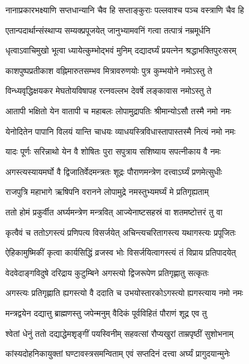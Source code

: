 \twolineshloka
{नानाप्रकारभक्ष्याणि सप्तधान्यानि चैव हि}
{सप्ताङ्कुराः पल्लवाश्च पञ्च वस्त्राणि चैव हि} %

\twolineshloka
{एतान्पदार्थान्संस्थाप्य सम्यक्प्रपूजयेत्}
{जानुभ्यामवनिं गत्वा तत्पात्रं नम्रमूर्धनि} %

\twolineshloka
{धृत्वाऽवाचिमुखो भूत्वा ध्यायेत्कुम्भोद्भवं मुनिम्}
{दद्यादर्घ्यं प्रयत्नेन श्रद्धाभक्तिपुरःसरम्} %

\twolineshloka
{काशपुष्पप्रतीकाश वह्निमारुतसम्भव}
{मित्रावरुणयोः पुत्र कुम्भयोने नमोऽस्तु ते} %

\twolineshloka
{विन्ध्यवृद्धिक्षयकर मेघतोयविषापह}
{रत्नवल्लभ देवर्षे लङ्कावास नमोऽस्तु ते} %

\twolineshloka
{आतापी भक्षितो येन वातापी च महाबलः}
{लोपामुद्रापतिः श्रीमान्योऽसौ तस्मै नमो नमः} %

\twolineshloka
{येनोदितेन पापानि विलयं यान्ति चाधयः}
{व्याधयस्त्रिविधास्तापास्तस्मै नित्यं नमो नमः} %

\twolineshloka
{यादः पूर्णः सरिन्नाथो येन वै शोषितः पुरा}
{सपुत्राय सशिष्याय सपत्नीकाय वै नमः} %

\twolineshloka
{अगस्त्यस्यायमर्घो वै द्विजातिर्वेदमन्त्रतः}
{शूद्रः पौराणमन्त्रेण दत्त्वाऽर्घ्यं प्रणमेत्सुधीः} %

\twolineshloka
{राजपुत्रि महाभागे ऋषिपनि वरानने}
{लोपामुद्रे नमस्तुभ्यमर्घ्यं मे प्रतिगृह्यताम्} %

\twolineshloka
{ततो होमं प्रकुर्वीत अर्घ्यमन्त्रेण मन्त्रवित्}
{आज्येनाष्टसहस्रं वा शतमष्टोत्तरं तु वा} %

\twolineshloka
{कृत्वैवं च ततोऽगस्त्यं प्रणिपत्य विसर्जयेत्}
{अचिन्त्यचरितागस्त्य यथागस्त्यः प्रपूजितः} %

\twolineshloka
{ऐहिकामुष्मिकीं कृत्वा कार्यसिद्धिं व्रजस्व भोः}
{विसर्जयित्वागस्त्यं तं विप्राय प्रतिपादयेत्} %

\twolineshloka
{वेदवेदाङ्गविदुषे दरिद्राय कुटुम्बिने}
{अगस्त्यो द्विजरूपेण प्रतिगृह्णातु सत्कृतः} %

\twolineshloka
{अगस्त्यः प्रतिगृह्णाति ह्यगस्त्यो वै ददाति च}
{उभयोस्तारकोऽगस्त्यो ह्यगस्त्याय नमो नमः} %

\twolineshloka
{मन्त्रद्वयेन दद्यात्तु ब्राह्मणस्तु जपेन्मनुम्}
{वैदिकं पूर्वविहितं पौराणं शूद्र एव तु} %

\twolineshloka
{श्वेतां धेनुं ततो दद्याद्धेमशृङ्गीं पयस्विनीम्}
{सहवत्सां रौप्यखुरां ताम्रपृष्ठीं सुशोभनाम्} %

\twolineshloka
{कांस्यदोहनिकायुक्तां घण्टावस्त्रसमन्विताम्}
{एवं सप्तदिनं दत्त्वा अर्घ्यं प्रागुदयान्मुनेः} %

